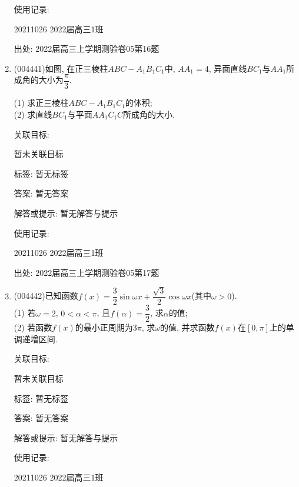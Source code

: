 \documentclass[10pt,a4paper]{article}
\begin{document}
\begin{enumerate}[1.]
使用记录:

20211026	2022届高三1班	


出处: 2022届高三上学期测验卷05第16题
\item { (004441)}如图, 在正三棱柱$ABC-A_1B_1C_1$中, $AA_1=4$, 异面直线$BC_1$与$AA_1$所成角的大小为$\dfrac{\pi}3$.
\begin{center}
\end{center}
(1) 求正三棱柱$ABC-A_1B_1C_1$的体积;\\
(2) 求直线$BC_1$与平面$AA_1C_1C$所成角的大小.


关联目标:

暂未关联目标



标签: 暂无标签

答案: 暂无答案

解答或提示: 暂无解答与提示

使用记录:

20211026	2022届高三1班		


出处: 2022届高三上学期测验卷05第17题
\item { (004442)}已知函数$f(x)=\dfrac 32\sin \omega x+\dfrac{\sqrt 3}2\cos \omega x$(其中$\omega >0$).\\
(1)	若$\omega =2$, $0<\alpha <\pi$, 且$f(\alpha)=\dfrac 32$, 求$\alpha$的值;\\
(2)	若函数$f(x)$的最小正周期为$3\pi$, 求$\omega$的值, 并求函数$f(x)$在$[0,\pi]$上的单调递增区间.


关联目标:

暂未关联目标



标签: 暂无标签

答案: 暂无答案

解答或提示: 暂无解答与提示

使用记录:

20211026	2022届高三1班		



\end{enumerate}
\end{document}

